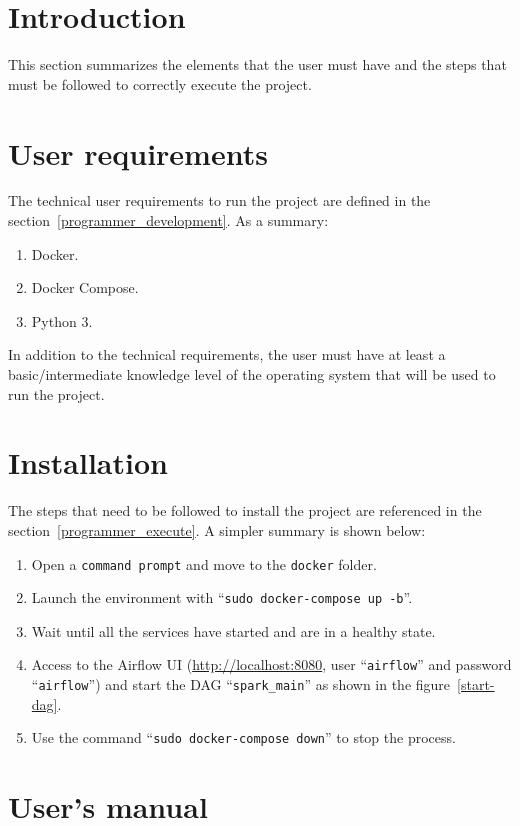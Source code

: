 
\section{Introduction}
\nonzeroparskip This section summarizes the elements that the user must have and the steps that must be followed to correctly execute the project.

\section{User requirements}
\nonzeroparskip The technical user requirements to run the project are defined in the section~\ref{programmer_development}. As a summary:
\begin{enumerate}
	\item Docker.
	\item Docker Compose.
	\item Python 3.
\end{enumerate}

\nonzeroparskip In addition to the technical requirements, the user must have at least a basic/intermediate knowledge level of the operating system that will be used to run the project.

\section{Installation}
\nonzeroparskip The steps that need to be followed to install the project are referenced in the section~\ref{programmer_execute}. A simpler summary is shown below:
\begin{enumerate}
	\item Open a \texttt{command prompt} and move to the \texttt{docker} folder.
	\item Launch the environment with ``\texttt{sudo docker-compose up -b}''.
	\item Wait until all the services have started and are in a healthy state.
	\item Access to the Airflow UI (\url{http://localhost:8080}, user ``\texttt{airflow}'' and password ``\texttt{airflow}'') and start the DAG ``\texttt{spark\_main}'' as shown in the figure~\ref{start-dag}.
	\item Use the command ``\texttt{sudo docker-compose down}'' to stop the process.
\end{enumerate}

\section{User's manual} \label{usermanual}

